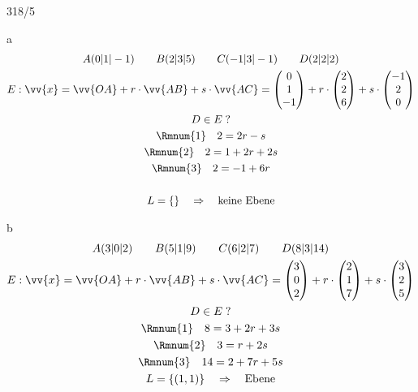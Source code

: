 \begin{exercise}{318/5}
  \item [a]
  \begin{gather*}
    A(0|1|-1) \qquad B(2|3|5) \qquad C(-1|3|-1) \qquad D(2|2|2) \\
    E: \vv{x} = \vv{OA} + r \cdot \vv{AB} + s \cdot \vv{AC} = \begin{pmatrix}0 \\ 1 \\ -1\end{pmatrix} + r \cdot \begin{pmatrix}2 \\ 2 \\ 6\end{pmatrix} + s \cdot \begin{pmatrix}-1 \\ 2 \\ 0\end{pmatrix} \\
    D \in E \; ? \\
    \text{\Rmnum{1}} \quad 2 = 2r - s \\
    \text{\Rmnum{2}} \quad 2 = 1 + 2r + 2s \\
    \text{\Rmnum{3}} \quad 2 = -1 + 6r \\\\
    L = \{\} \quad\Rightarrow\quad \text{keine Ebene}
  \end{gather*}
  \item [b]
  \begin{gather*}
    A(3|0|2) \qquad B(5|1|9) \qquad C(6|2|7) \qquad D(8|3|14) \\
    E: \vv{x} = \vv{OA} + r \cdot \vv{AB} + s \cdot \vv{AC} = \begin{pmatrix}3 \\ 0 \\ 2\end{pmatrix} + r \cdot \begin{pmatrix}2 \\ 1 \\ 7\end{pmatrix} + s \cdot \begin{pmatrix}3 \\ 2 \\ 5\end{pmatrix} \\
    D \in E \; ? \\
    \text{\Rmnum{1}} \quad 8 = 3 + 2r + 3s \\
    \text{\Rmnum{2}} \quad 3 = r + 2s \\
    \text{\Rmnum{3}} \quad 14 = 2 + 7r + 5s \\
    L = \{(1, 1)\} \quad\Rightarrow\quad \text{Ebene}
  \end{gather*}
\end{exercise}
